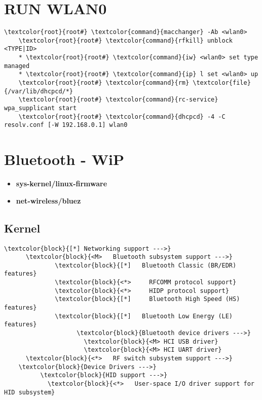 \documentclass[10pt, a4paper, onecolumn, openany]{book}         %
\begin{document}
\section{RUN WLAN0}
\begin{Verbatim}[commandchars=\\\{\}]
    \textcolor{root}{root#} \textcolor{command}{macchanger} -Ab <wlan0>
    \textcolor{root}{root#} \textcolor{command}{rfkill} unblock <TYPE|ID>
    * \textcolor{root}{root#} \textcolor{command}{iw} <wlan0> set type managed
    * \textcolor{root}{root#} \textcolor{command}{ip} l set <wlan0> up
    \textcolor{root}{root#} \textcolor{command}{rm} \textcolor{file}{/var/lib/dhcpcd/*}
    \textcolor{root}{root#} \textcolor{command}{rc-service} wpa_supplicant start
    \textcolor{root}{root#} \textcolor{command}{dhcpcd} -4 -C resolv.conf [-W 192.168.0.1] wlan0
\end{Verbatim}



\section{Bluetooth - WiP}
\begin{itemize}
    \item \textbf{sys-kernel/linux-firmware}
    \item \textbf{net-wireless/bluez}
\end{itemize}
\subsection{Kernel}
\begin{Verbatim}[commandchars=\\\{\}]
\textcolor{block}{[*] Networking support --->}
      \textcolor{block}{<M>   Bluetooth subsystem support --->}
              \textcolor{block}{[*]   Bluetooth Classic (BR/EDR) features}
              \textcolor{block}{<*>     RFCOMM protocol support}
              \textcolor{block}{<*>     HIDP protocol support}
              \textcolor{block}{[*]     Bluetooth High Speed (HS) features}
              \textcolor{block}{[*]   Bluetooth Low Energy (LE) features}
                    \textcolor{block}{Bluetooth device drivers --->}
                      \textcolor{block}{<M> HCI USB driver}
                      \textcolor{block}{<M> HCI UART driver}
      \textcolor{block}{<*>   RF switch subsystem support --->}
    \textcolor{block}{Device Drivers --->}
          \textcolor{block}{HID support --->}
            \textcolor{block}{<*>   User-space I/O driver support for HID subsystem}
\end{Verbatim}
\end{document}
